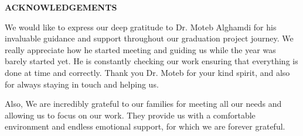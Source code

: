 \newpage

\setcounter{page}{2}
\renewcommand{\thepage}{\roman{page}}


\begin{center}
    \Large\textbf{ACKNOWLEDGEMENTS}
\end{center}
\vspace{6pt}

We would like to express our deep gratitude to Dr. Moteb Alghamdi for his invaluable guidance and support throughout our graduation project journey. We really appreciate how he started meeting and guiding us while the year was barely started yet. He is constantly checking our work ensuring that everything is done at time and correctly. Thank you Dr. Moteb for your kind spirit, and also for always staying in touch and helping us.


Also, We are incredibly grateful to our families for meeting all our needs and allowing us to focus on our work. They provide us with a comfortable environment and endless emotional support, for which we are forever grateful.
